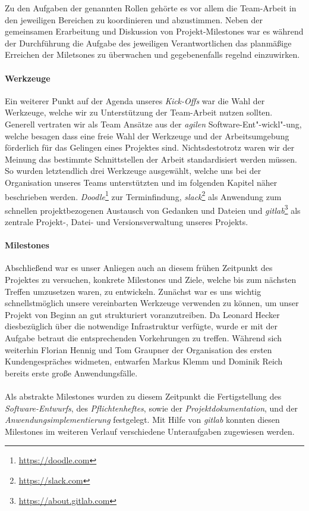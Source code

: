 Zu den Aufgaben der genannten Rollen gehörte es vor allem die Team-Arbeit in den jeweiligen Bereichen zu koordinieren und abzustimmen. Neben der gemeinsamen Erarbeitung und Diskussion von Projekt-Milestones war es während der Durchführung die Aufgabe des jeweiligen Verantwortlichen das planmäßige Erreichen der Miletsones zu überwachen und gegebenenfalls regelnd einzuwirken.

\paragraph{Werkzeuge}Ein weiterer Punkt auf der Agenda unseres \textit{Kick-Offs} war die Wahl der Werkzeuge, welche wir zu Unterstützung der Team-Arbeit nutzen sollten. Generell vertraten wir als Team Ansätze aus der \textit{agilen} Software-Ent"-wickl"-ung, welche besagen dass eine freie Wahl der Werkzeuge und der Arbeitsumgebung förderlich für das Gelingen eines Projektes sind. Nichtsdestotrotz waren wir der Meinung das bestimmte Schnittstellen der Arbeit standardisiert werden müssen. So wurden letztendlich drei Werkzeuge ausgewählt, welche uns bei der Organisation unseres Teams unterstützten und im folgenden Kapitel näher beschrieben werden. \textit{Doodle}\footnote{\url{https://doodle.com}} zur Terminfindung, \textit{slack}\footnote{\url{https://slack.com}} als Anwendung zum schnellen projektbezogenen Austausch von Gedanken und Dateien und \textit{gitlab}\footnote{\url{https://about.gitlab.com}} als zentrale Projekt-, Datei- und Versionsverwaltung unseres Projekts.

\paragraph{Milestones}Abschließend war es unser Anliegen auch an diesem frühen Zeitpunkt des Projektes zu versuchen, konkrete Milestones und Ziele, welche bis zum nächsten Treffen umzusetzen waren, zu entwickeln. Zunächst war es uns wichtig schnellstmöglich unsere vereinbarten Werkzeuge verwenden zu können, um unser Projekt von Beginn an gut strukturiert voranzutreiben. Da Leonard Hecker diesbezüglich über die notwendige Infrastruktur verfügte, wurde er mit der Aufgabe betraut die entsprechenden Vorkehrungen zu treffen. Während sich weiterhin Florian Hennig und Tom Graupner der Organisation des ersten Kundengespräches widmeten, entwarfen Markus Klemm und Dominik Reich bereits erste große Anwendungsfälle.

\paragraph{}Als abstrakte Milestones wurden zu diesem Zeitpunkt die Fertigstellung des \textit{Software-Entwurfs}, des \textit{Pflichtenheftes}, sowie der \textit{Projektdokumentation}, und der \textit{Anwendungsimplementierung} festgelegt. Mit Hilfe von \textit{gitlab} konnten diesen Milestones im weiteren Verlauf verschiedene Unteraufgaben zugewiesen werden.

